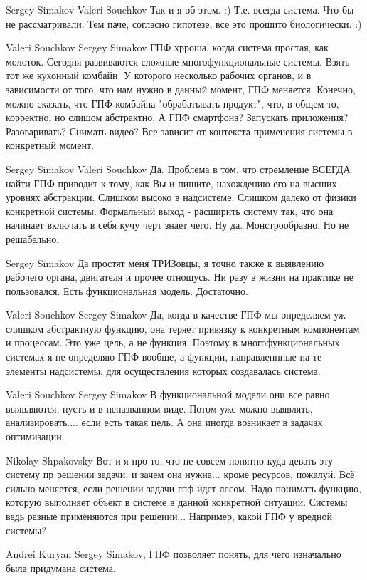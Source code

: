 \documentclass[11pt,a4paper]{article}
\begin{document}
Sergey Simakov Valeri Souchkov Так и я об этом. :) Т.е. всегда система. Что бы
не рассматривали. Тем паче, согласно гипотезе, все это прошито
биологически. :)

Valeri Souchkov Sergey Simakov ГПФ хрроша, когда система простая, как
молоток. Сегодня развиваются сложные многофункциональные системы. Взять тот же
кухонный комбайн. У которого несколько рабочих органов, и в зависимости от
того, что нам нужно в данный момент, ГПФ меняется. Конечно, можно сказать, что
ГПФ комбайна "обрабатывать продукт", что, в общем-то, корректно, но слишом
абстрактно. А ГПФ смартфона? Запускать приложения? Разоваривать? Снимать
видео? Все зависит от контекста применения системы в конкретный момент.

Sergey Simakov Valeri Souchkov Да. Проблема в том, что стремление ВСЕГДА найти
ГПФ приводит к тому, как Вы и пишите, нахождению его на высших уровнях
абстракции. Слишком высоко в надсистеме. Слишком далеко от физики конкретной
системы.  Формальный выход - расширить систему так, что она начинает включать
в себя кучу черт знает чего. Ну да. Монстрообразно. Но не решабельно.

Sergey Simakov Да простят меня ТРИЗовцы, я точно также к выявлению рабочего
органа, двигателя и прочее отношусь. Ни разу в жизни на практике не
пользовался. Есть функциональная модель. Достаточно.

Valeri Souchkov Sergey Simakov Да, когда в качестве ГПФ мы определяем уж
слишком абстрактную функцию, она теряет привязку к конкретным компонентам и
процессам. Это уже цель, а не функция. Поэтому в многофункциональных системах
я не определяю ГПФ вообще, а функции, направленнные на те элементы надсистемы,
для осуществления которых создавалась система.

Valeri Souchkov Sergey Simakov В функциональной модели они все равно
выявляются, пусть и в неназванном виде. Потом уже можно выявлять,
анализировать.... если есть такая цель. А она иногда возникает в задачах
оптимизации.

Nikolay Shpakovsky Вот и я про то, что не совсем понятно куда девать эту
систему пр решении задачи, и зачем она нужна... кроме ресурсов, пожалуй.  Всё
сильно меняется, если решении задачи гпф идет лесом. Надо понимать функцию,
которую выполняет объект в системе в данной конкретной ситуации. Системы ведь
разные применяются при решении...  Например, какой ГПФ у вредной системы?

Andrei Kuryan Sergey Simakov, ГПФ позволяет понять, для чего изначально была
придумана система.
\end{document}
